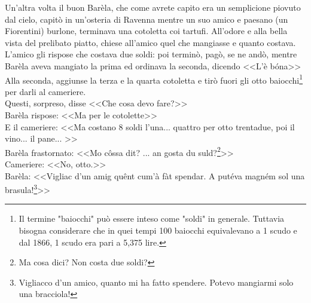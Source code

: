 Un'altra volta il buon Barèla, che come avrete capito era un semplicione piovuto dal cielo, capitò in un'osteria di Ravenna mentre un suo amico e paesano (un Fiorentini) burlone, terminava una cotoletta coi tartufi. All'odore e alla bella vista del prelibato piatto, chiese all'amico quel che mangiasse e quanto costava. L'amico gli rispose che costava due soldi: poi terminò, pagò, se ne andò, mentre Barèla aveva mangiato la prima ed ordinava la seconda, dicendo <<L'è bóna>>\\
Alla seconda, aggiunse la terza e la quarta cotoletta e tirò fuori gli otto baiocchi\footnote{Il termine "baiocchi" può essere inteso come "soldi" in generale. Tuttavia bisogna considerare che in quei tempi 100 baiocchi equivalevano a 1 scudo e dal 1866, 1 scudo era pari a 5,375 lire.} per darli al cameriere.\\
\indent Questi, sorpreso, disse <<Che cosa devo fare?>>\\
\indent {}Barèla rispose: <<Ma per le cotolette>>\\
\indent E il cameriere: <<Ma costano 8 soldi l'una... quattro per otto trentadue, poi il vino... il pane... >>\\
\indent {}Barèla frastornato: <<Mo côssa dit? ... an gosta du suld?\footnote{Ma cosa dici? Non costa due soldi?}>>\\
\indent Cameriere: <<No, otto.>>\\
\indent {}Barèla: <<Vigliac d'un amig quênt cum'à fàt spendar. A putéva magném sol una brasula!\footnote{Vigliacco d'un amico, quanto mi ha fatto spendere. Potevo mangiarmi solo una bracciola!}>>











































